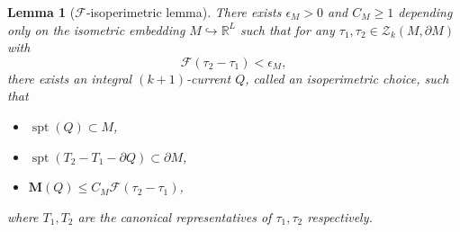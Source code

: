 \documentclass[10pt]{amsart}
\newtheorem{lemma}[theorem]{Lemma}
\theoremstyle{definition}
\theoremstyle{remark}
\numberwithin{equation}{section}
\newcommand{\R}{\mathbb{R}}
\newcommand{\F}{\mathcal{F}}
\newcommand{\ep}{\epsilon}
\newcommand{\Z}{\mathcal{Z}}
\newcommand{\M}{\mathbf{M}}
\newcommand{\spt}{\operatorname{spt}}
\begin{document}
\begin{lemma}[$\F$-isoperimetric lemma]
\label{L:isoperimetric-F}
There exists $\ep_M>0$ and $C_M \geq 1$ depending only on the isometric embedding $M \hookrightarrow \R^L$ such that for any $\tau_1, \tau_2\in \Z_k(M, \partial M)$ with 
\[ \F(\tau_2-\tau_1) < \ep_M,\]
there exists an integral $(k+1)$-current $Q$, called an \emph{isoperimetric choice}, such that
\begin{itemize}
\item $\spt(Q) \subset M$,
\item $\spt(T_2-T_1-\partial Q)\subset\partial M$,
\item $\M(Q)\leq C_M \F(\tau_2-\tau_1)$,
\end{itemize}
where $T_1,T_2$ are the canonical representatives of $\tau_1,\tau_2$ respectively. 
\end{lemma}
\end{document}
